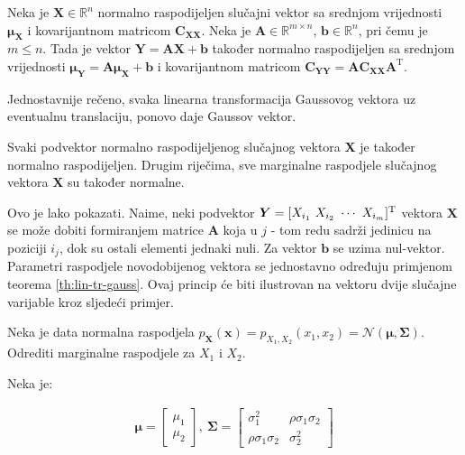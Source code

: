 \begin{theorem}
	\label{th:lin-tr-gauss}
	Neka je $\bm X \in \mathbb{R}^n$ normalno raspodijeljen slučajni vektor sa
	srednjom vrijednosti $\bm\mu_{\bm X}$ i kovarijantnom matricom $\bm C_{\bm
	X\bm X}$. Neka je $\bm A \in \mathbb{R}^{m\times n}$, $\bm b \in
	\mathbb{R}^n$, pri čemu je $m\le n$. Tada je vektor $\bm Y = \bm A \bm X + \bm
	b$ također normalno raspodijeljen sa srednjom vrijednosti $\bm\mu_{\bm Y} =
	\bm A\bm\mu_{\bm X} + \bm b$ i kovarijantnom matricom $\bm C_{\bm Y\bm Y} =
	\bm A \bm C_{\bm X\bm X} \bm A^\mathrm T$.

\end{theorem}

Jednostavnije rečeno, svaka linearna transformacija Gaussovog vektora uz
eventualnu translaciju, ponovo daje Gaussov vektor.

\begin{corollary}
	Svaki podvektor normalno raspodijeljenog slučajnog vektora $\bm X$ je također
	normalno raspodijeljen. Drugim riječima, sve marginalne raspodjele slučajnog
	vektora $\bm X$ su također normalne.
\end{corollary}

Ovo je lako pokazati. Naime, neki podvektor $\bm Y = [X_{i_1}\ X_{i_2}\ \cdots\
X_{i_m}]^\text T$ vektora $\bm X$ se može dobiti formiranjem matrice $\bm A$
koja u $j$ - tom redu sadrži jedinicu na poziciji $i_j$, dok su ostali elementi
jednaki nuli. Za vektor $\bm b$ se uzima nul-vektor.  Parametri raspodjele
novodobijenog vektora se jednostavno određuju primjenom teorema
\ref{th:lin-tr-gauss}. Ovaj princip će biti ilustrovan na vektoru dvije slučajne
varijable kroz sljedeći primjer.

\begin{exmp}
  Neka je data normalna raspodjela $p_{\bm X}(\bm x) = p_{X_1,X_2}(x_1, x_2) =
  \mathcal{N}(\bm\mu, \bm \Sigma)$. Odrediti marginalne raspodjele za $X_1$
  i $X_2$.
\end{exmp}

Neka je:

\begin{eqnarray} \label{eq:kovarijansa-2d}
	\bm\mu = \left[\begin{array}{c}
		\mu_1 \\ \mu_2
	\end{array}\right],\ 
	\bm\Sigma = \left[\begin{array}{cc}
	  \sigma_1^2 & \rho\sigma_1\sigma_2 \\  \rho\sigma_1\sigma_2 & \sigma_2^2
	\end{array}\right]
\end{eqnarray}

